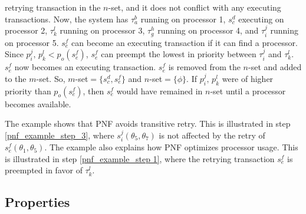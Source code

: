 \documentclass[a4paper,english]{article}
\begin{document}
\begin{compactenum}
retrying transaction in the $n$-set, and it does not conflict with
any executing transactions. Now, the system has $\tau_{a}^{b}$ running
on processor 1, $s_{c}^{d}$ executing on processor 2, $\tau_{k}^{l}$
running on processor 3, $\tau_{g}^{h}$ running on processor 4, and
$\tau_{i}^{j}$ running on processor 5. $s_{e}^{f}$ can become an
executing transaction if it can find a processor. 
%
Since $p_{i}^{j},\, p_{k}^{l}<p_{o}(s_{e}^{f})$,
$s_{e}^{f}$ can preempt the lowest in priority between $\tau_{i}^{j}$
and $\tau_{k}^{l}$. $s_{e}^{f}$ now becomes an executing transaction.
$s_{e}^{f}$ is removed from the $n$-set and added to the $m$-set.
So, $m$-set$=\{s_{c}^{d},s_{e}^{f}\}$ and $n$-set$=\{\phi\}$. If $p_{i}^{j},\, p_{k}^{l}$
were of higher priority than $p_{o}(s_{e}^{f})$, then $s_{e}^{f}$
would have remained in $n$-set until a processor becomes available.
%
\end{compactenum}
The  example shows that PNF avoids transitive retry. This is illustrated in step \ref{pnf_example_step_3}, where $s_{i}^{j}(\theta_{5},\theta_{7})$ is not affected by the  retry of $s_{e}^{f}(\theta_{1},\theta_{5})$. The example also explains how
PNF optimizes processor usage. This is illustrated in step \ref{pnf_example_step 1}, 
where the retrying transaction $s_{e}^{f}$ is preempted in favor of $\tau_{k}^{l}$.


\subsection{Properties\label{pnf properties sec}}
\end{document}
